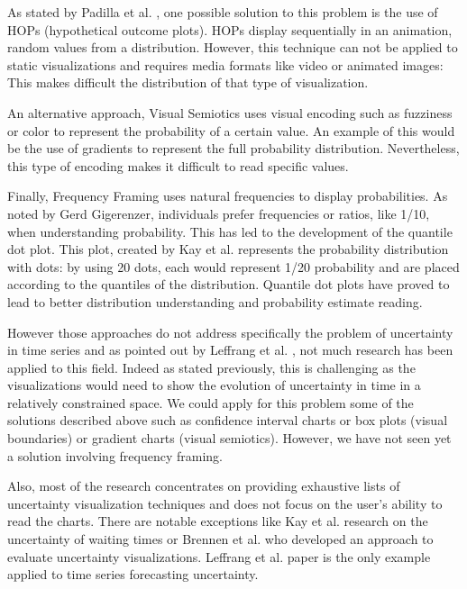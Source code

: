 \documentclass[a4paper,3p,sort&compress]{elsarticle}
\begin{document}
As stated by Padilla et al. \cite{padilla_uncertainty_2021}, one possible solution to this problem is the use of HOPs
(hypothetical outcome plots). HOPs display
sequentially in an animation, random values from a distribution. However, this technique can not be
applied to static visualizations and requires media formats like video or animated images: This makes difficult the distribution
of that type of visualization.

An alternative approach, Visual Semiotics uses visual encoding such as fuzziness or color to represent
the probability of a certain value. An example of this would be the use of gradients to represent the
full probability distribution. Nevertheless, this type of encoding makes it difficult to read specific
values.

Finally, Frequency Framing uses natural frequencies to display probabilities. As noted by Gerd
Gigerenzer, individuals prefer frequencies or ratios, like 1/10, when understanding probability. This has
led to the development of the quantile dot plot. This plot, created by Kay et al.
\cite{2016-when-ish-is-my-bus}
represents
the probability distribution with dots: by using 20 dots, each would represent 1/20 probability
and are placed according
to the quantiles of the distribution. Quantile dot plots have proved to lead to better distribution
understanding and probability estimate reading.

However those approaches do not address specifically the problem of uncertainty in time series
and as pointed out by Leffrang et al. \cite{leffrang_should_2021}, not much research has been applied to this
field. Indeed as stated previously, this is challenging as the visualizations would need to show the evolution
of uncertainty in time in a relatively constrained space. We could apply for this problem some of the solutions
described above such as confidence interval charts or
box plots (visual boundaries) or gradient charts (visual semiotics). However, we have not seen yet a solution involving
frequency framing.

Also, most of the research concentrates on providing exhaustive lists of uncertainty visualization techniques and does not
focus on the user's ability to read the charts. There are notable exceptions like Kay et al. \cite{2016-when-ish-is-my-bus}
research on the uncertainty of waiting times or Brennen et al. \cite{brennen_instrument_2018} who developed an
approach to evaluate uncertainty visualizations.
Leffrang et al. \cite{leffrang_should_2021} paper is the only example applied to time series forecasting uncertainty.
\end{document}
